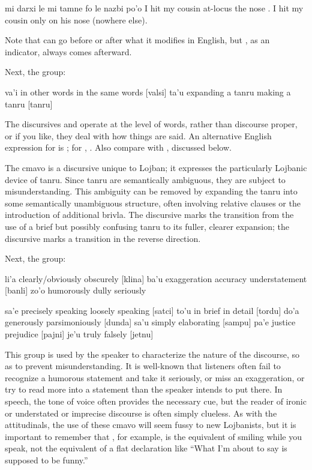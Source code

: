 \begin{example}
mi darxi le mi tamne fo le nazbi po'o\n
I hit my cousin at-locus the nose .\n
I hit my cousin only on his nose (nowhere else).
\end{example}

Note that  can go before or after what it modifies in
    English, but , as an indicator, always comes afterward.

Next, the  group:

   va'i    in other words      in the same words
            [valsi]
    ta'u    expanding a tanru   making a tanru
            [tanru]

The discursives  and  operate at the level of
    words, rather than discourse proper, or if you like, they deal
    with how things are said. An alternative English expression for
     is ; for , .
    Also compare  with , discussed below. 

The cmavo  is a discursive unique to Lojban; it
    expresses the particularly Lojbanic device of tanru. Since
    tanru are semantically ambiguous, they are subject to
    misunderstanding. This ambiguity can be removed by expanding
    the tanru into some semantically unambiguous structure, often
    involving relative clauses or the introduction of additional
    brivla. The discursive  marks the transition from the
    use of a brief but possibly confusing tanru to its fuller,
    clearer expansion; the discursive  marks a
    transition in the reverse direction.

Next, the  group:

   li'a    clearly/obviously       obscurely
            [klina]
    ba'u    exaggeration    accuracy    understatement
            [banli]
    zo'o    humorously  dully       seriously

sa'e    precisely speaking      loosely speaking
            [satci]
    to'u    in brief            in detail
            [tordu]
    do'a    generously          parsimoniously
            [dunda]
    sa'u    simply              elaborating
            [sampu]
    pa'e    justice             prejudice
            [pajni]
    je'u    truly               falsely
            [jetnu]

This group is used by the speaker to characterize the nature of
    the discourse, so as to prevent misunderstanding. It is
    well-known that listeners often fail to recognize a humorous
    statement and take it seriously, or miss an exaggeration, or
    try to read more into a statement than the speaker intends to
    put there. In speech, the tone of voice often provides the
    necessary cue, but the reader of ironic or understated or
    imprecise discourse is often simply clueless. As with the
    attitudinals, the use of these cmavo will seem fussy to new
    Lojbanists, but it is important to remember that , for
    example, is the equivalent of smiling while you speak, not the
    equivalent of a flat declaration like ``What I'm about to say
    is supposed to be funny.'' 

